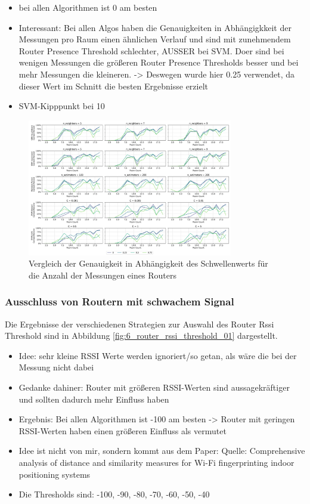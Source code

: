 \begin{itemize}
    \item bei allen Algorithmen ist 0 am besten
    \item Interessant: Bei allen Algos haben die Genauigkeiten in Abhängigkkeit der Messungen pro Raum einen ähnlichen Verlauf und sind mit zunehmendem Router Presence Threshold schlechter, AUSSER bei SVM. Doer sind bei wenigen Messungen die größeren Router Presence Thresholds besser und bei mehr Messungen die kleineren. -> Deswegen wurde hier 0.25 verwendet, da dieser Wert im Schnitt die besten Ergebnisse erzielt
    \item SVM-Kipppunkt bei 10
\end{itemize}

\begin{figure}[H]
    \centering
    \includegraphics[width=0.8\textwidth]{images/5_router_presence_threshold_02.png}
    \caption{Vergleich der Genauigkeit in Abhängigkeit des Schwellenwerts für die Anzahl der Messungen eines Routers}
    \label{fig:5_router_presence_threshold_02}
\end{figure}

\subsubsection{Ausschluss von Routern mit schwachem Signal}

Die Ergebnisse der verschiedenen Strategien zur Auswahl des Router Rssi Threshold sind in Abbildung \ref{fig:6_router_rssi_threshold_01} dargestellt.

\begin{itemize}
    \item Idee: sehr kleine RSSI Werte werden ignoriert/so getan, als wäre die bei der Messung nicht dabei
    \item Gedanke dahiner: Router mit größeren RSSI-Werten sind aussagekräftiger und sollten dadurch mehr Einfluss haben
    \item Ergebnis: Bei allen Algorithmen ist -100 am besten -> Router mit geringen RSSI-Werten haben einen größeren Einfluss als vermutet
    \item Idee ist nicht von mir, sondern kommt aus dem Paper: Quelle: Comprehensive analysis of distance and similarity measures for Wi-Fi fingerprinting indoor positioning systems
    \item Die Thresholds sind: -100, -90, -80, -70, -60, -50, -40
\end{itemize}

